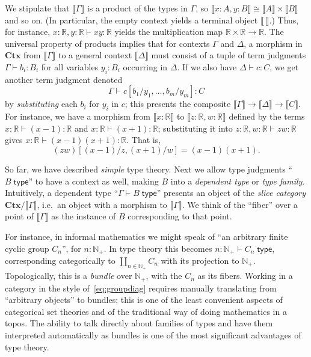 \documentclass[12pt]{article}
\def\ty{\;\mathsf{type}}
\def\m#1{\llbracket#1\rrbracket}
\def\R{\mathbb{R}}
\def\Np{\mathbb{N}_+}
\def\types{\vdash}
\def\Ctx{\mathbf{Ctx}}
\numberwithin{equation}{section}
\begin{document}
We stipulate that $\m\Gamma$ is a product of the types in $\Gamma$, so $\m{x:A,y:B}\cong \m{A}\times \m B$ and so on.
(In particular, the empty context yields a terminal object $\m{~}$.)
Thus, for instance, $x:\R, y:\R \types x y:\R$ yields the multiplication map $\R\times \R \to \R$.
%
The universal property of products implies that for contexts $\Gamma$ and $\Delta$, a morphism in $\Ctx$ from $\m\Gamma$ to a general context $\m\Delta$ must consist of a tuple of term judgments $\Gamma \types b_i : B_i$ for all variables $y_i:B_i$ occurring in $\Delta$.
If we also have $\Delta \types c:C$, we get another term judgment denoted
\[\Gamma \types c[b_1/y_1,\dots,b_m/y_m]:C\]
by \emph{substituting} each $b_i$ for $y_i$ in $c$; this presents the composite $\m \Gamma \to \m \Delta \to \m C$.
For instance, we have a morphism from $\m{x:\R}$ to $\m{z:\R,w:\R}$ defined by the terms $x:\R \types (x-1):\R$ and $x:\R \types (x+1):\R$; substituting it into $z:\R, w:\R \types z w:\R$ gives $x:\R \types (x-1)(x+1) : \R$.
That is,
\[(z w)[(x-1)/z,(x+1)/w] = (x-1)(x+1).\]

So far, we have described \emph{simple} type theory.
Next we allow type judgments ``$B\ty$'' to have a context as well, making $B$ into a \emph{dependent type} or \emph{type family}.
Intuitively, a dependent type ``$\Gamma \types B\ty$'' presents an object of the \emph{slice category} $\Ctx/\m\Gamma$, i.e.\ an object with a morphism to $\m\Gamma$.
We think of the ``fiber'' over a point of $\m\Gamma$ as the instance of $B$ corresponding to that point.

For instance, in informal mathematics we might speak of ``an arbitrary finite cyclic group $C_n$'', for $n: \Np$.
In type theory this becomes $n:\Np \types C_n \ty$, corresponding categorically to $\coprod_{n\in \Np} C_n$ with its projection to $\Np$.
Topologically, this is a \emph{bundle} over $\Np$, with the $C_n$ as its fibers.
Working in a category in the style of~\eqref{eq:groupdiag} requires manually translating from ``arbitrary objects'' to bundles; this is one of the least convenient aspects of categorical set theories and of the traditional way of doing mathematics in a topos.
The ability to talk directly about families of types and have them interpreted automatically as bundles is one of the most significant advantages of type theory.
\end{document}
